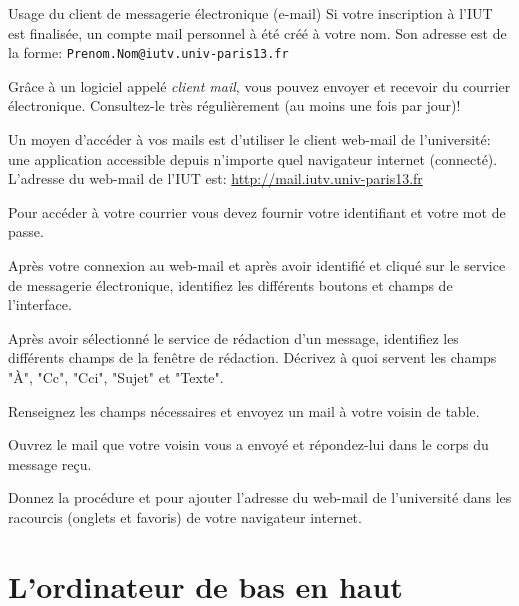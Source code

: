 \begin{exercice}
  \begin{exercicelet}{Usage du client de messagerie électronique
      (e-mail)}
    Si votre inscription à l'IUT est finalisée, un compte mail personnel
    à été créé à votre nom. Son adresse est de la forme:
    \texttt{Prenom.Nom@iutv.univ-paris13.fr}

    Grâce à un logiciel appelé \emph{client mail}, vous pouvez envoyer
    et recevoir du courrier électronique. Consultez-le très
    régulièrement (au moins une fois par jour)!

    Un moyen d'accéder à vos mails est d'utiliser le client web-mail de
    l'université: une application accessible depuis n'importe quel
    navigateur internet (connecté).  L'adresse du web-mail de l'IUT est:
    \url{http://mail.iutv.univ-paris13.fr}

    Pour accéder à votre courrier vous devez fournir votre identifiant
    et votre mot de passe.

    \begin{questions}
    \item Après votre connexion au web-mail et après avoir identifié et
      cliqué sur le service de messagerie électronique, identifiez les
      différents boutons et champs de l'interface.
    \item Après avoir sélectionné le service de rédaction d'un message,
      identifiez les différents champs de la fenêtre de
      rédaction. Décrivez à quoi servent les champs "À", "Cc", "Cci",
      "Sujet" et "Texte".
    \item Renseignez les champs nécessaires et envoyez un mail à votre
      voisin de table.
    \item Ouvrez le mail que votre voisin vous a envoyé et répondez-lui
      dans le corps du message reçu.
    \item Donnez la procédure et pour ajouter l'adresse du web-mail de
      l'université dans les racourcis (onglets et favoris) de votre
      navigateur internet.
    \end{questions}
  \end{exercicelet}
\end{exercice}

\section{L'ordinateur de bas en haut}

